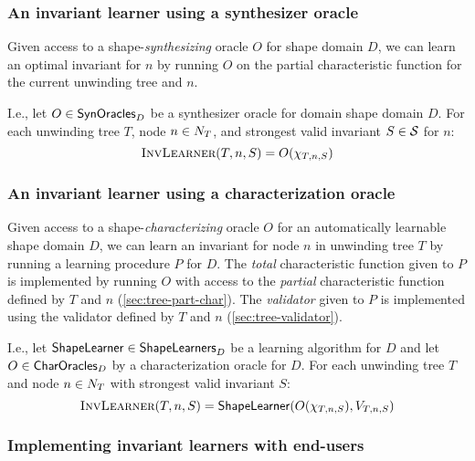 \subsubsection{An invariant learner using a synthesizer oracle}
\label{sec:syn-sep-learner}
Given access to a shape-\emph{synthesizing} oracle $O$ for shape
domain $D$, we can learn an optimal invariant for $n$ by running $O$
on the partial characteristic function for the current unwinding tree
and $n$.

I.e., let $O \in \mathsf{SynOracles}_D$ be a synthesizer oracle for domain
shape domain $D$.
%
For each unwinding tree $T$, node $n \in N_T$, and strongest
valid invariant $S \in \mathcal{S}$ for $n$:
%
\[
\textsc{InvLearner}(T, n, S) = O(\chi_{T, n, S})
\]

\subsubsection{An invariant learner using a characterization oracle}
\label{sec:syn-char-learner}
%
Given access to a shape-\emph{characterizing} oracle $O$ for an
automatically learnable shape domain $D$, we can learn an invariant for
node $n$ in unwinding tree $T$ by running a learning procedure $P$ for
$D$.
%
The \emph{total} characteristic function given to $P$ is implemented
by running $O$ with access to the \emph{partial} characteristic
function defined by $T$ and $n$ (\autoref{sec:tree-part-char}).
%
The \emph{validator} given to $P$ is implemented using the validator
defined by $T$ and $n$ (\autoref{sec:tree-validator}).

I.e., let $\mathsf{ShapeLearner} \in \mathsf{ShapeLearners}_D$ be a learning algorithm
for $D$ and let $O \in \mathsf{CharOracles}_D$ by a characterization oracle
for $D$.
%
For each unwinding tree $T$ and node $n \in N_T$ with strongest
valid invariant $S$:
%
\[
\seplearner(T, n, S) =
%
\shapelearner(O(\treepartchar_{T, n, S}), \treevalidate_{T, n, S})
\]

\subsubsection{Implementing invariant learners with end-users}
\label{sec:practical-oracles}
%
